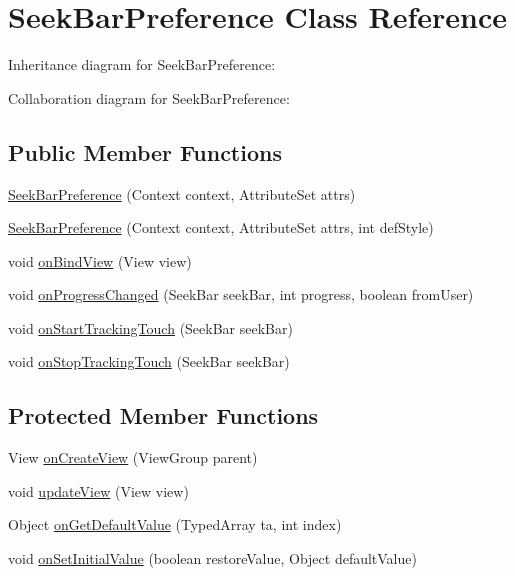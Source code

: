 \hypertarget{classcom_1_1robobunny_1_1_seek_bar_preference}{\section{\-Seek\-Bar\-Preference \-Class \-Reference}
\label{classcom_1_1robobunny_1_1_seek_bar_preference}
}


\-Inheritance diagram for \-Seek\-Bar\-Preference\-:


\-Collaboration diagram for \-Seek\-Bar\-Preference\-:
\subsection*{\-Public \-Member \-Functions}
\begin{DoxyCompactItemize}
\item 
\hyperlink{classcom_1_1robobunny_1_1_seek_bar_preference_a3d1bf6a235348b2c6a5139913ffb5b4c}{\-Seek\-Bar\-Preference} (\-Context context, \-Attribute\-Set attrs)
\item 
\hyperlink{classcom_1_1robobunny_1_1_seek_bar_preference_a3aa399fce67c9033b7a2150e7b01bf1f}{\-Seek\-Bar\-Preference} (\-Context context, \-Attribute\-Set attrs, int def\-Style)
\item 
void \hyperlink{classcom_1_1robobunny_1_1_seek_bar_preference_a639c4c841346a2307583dca43e21072d}{on\-Bind\-View} (\-View view)
\item 
void \hyperlink{classcom_1_1robobunny_1_1_seek_bar_preference_a23502e32ba49bc0ae99ebb3f013ff66f}{on\-Progress\-Changed} (\-Seek\-Bar seek\-Bar, int progress, boolean from\-User)
\item 
void \hyperlink{classcom_1_1robobunny_1_1_seek_bar_preference_a50aa0f5f1b390b2d5ffc7e0b6ccdb474}{on\-Start\-Tracking\-Touch} (\-Seek\-Bar seek\-Bar)
\item 
void \hyperlink{classcom_1_1robobunny_1_1_seek_bar_preference_abb13b75125cb8cb24fbeeef2451e262c}{on\-Stop\-Tracking\-Touch} (\-Seek\-Bar seek\-Bar)
\end{DoxyCompactItemize}
\subsection*{\-Protected \-Member \-Functions}
\begin{DoxyCompactItemize}
\item 
\-View \hyperlink{classcom_1_1robobunny_1_1_seek_bar_preference_a536331cb325a0ff2434ee1824d5636fa}{on\-Create\-View} (\-View\-Group parent)
\item 
void \hyperlink{classcom_1_1robobunny_1_1_seek_bar_preference_a7f4a84eec1457e51b0b8d44589c57115}{update\-View} (\-View view)
\item 
\-Object \hyperlink{classcom_1_1robobunny_1_1_seek_bar_preference_adaebda2f09121fde1679521e2849b870}{on\-Get\-Default\-Value} (\-Typed\-Array ta, int index)
\item 
void \hyperlink{classcom_1_1robobunny_1_1_seek_bar_preference_a30e4c73c8cd59e762943375e8b8399de}{on\-Set\-Initial\-Value} (boolean restore\-Value, \-Object default\-Value)
\end{DoxyCompactItemize}



